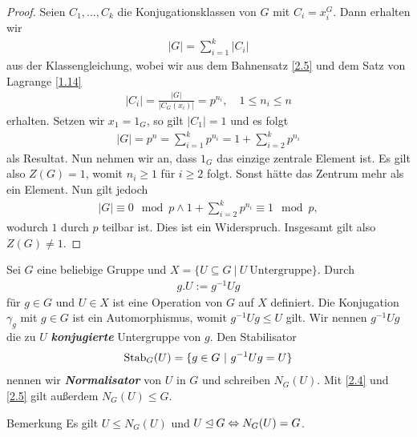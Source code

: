 \begin{proof}
Seien $C_1,...,C_k$ die Konjugationsklassen von $G$ mit $C_i = x_i^G$.
Dann erhalten wir 
\begin{align*}
|G| = \sum\limits_{i=1}^k |C_i|
\end{align*}
aus der Klassengleichung, wobei wir aus dem Bahnensatz \ref{2.5} und dem Satz von Lagrange \ref{1.14}
\begin{align*}
|C_i| = \frac{|G|}{|C_G(x_i)|} = p^{n_i}, \quad 1 \leq n_i \leq n
\end{align*}
erhalten. Setzen wir $x_1 = 1_G$, so gilt $|C_1| = 1$ und es folgt
\begin{align*}
|G| = p^n = \sum \limits_{i=1}^k p^{n_i} = 1 + \sum \limits_{i=2}^k p^{n_i}
\end{align*}
als Resultat. Nun nehmen wir an, dass $1_G$ das einzige zentrale Element ist.
Es gilt also $Z(G) = 1$, womit $n_i \geq 1$ für $i \geq 2$ folgt. Sonst hätte das Zentrum mehr als ein Element.
Nun gilt jedoch 
\begin{align*}
|G| \equiv 0 \mod p \wedge 1 + \sum \limits_{i=2}^k p^{n_i} \equiv 1 \mod p,
\end{align*}
wodurch $1$ durch $p$ teilbar ist. Dies ist ein Widerspruch.
Insgesamt gilt also $Z(G) \neq 1$.
\end{proof}

\begin{df}\label{skript:2.11}  
Sei $G$ eine beliebige Gruppe und $X = \lbrace U \subseteq G \ | \ U \ \text{Untergruppe} \rbrace$.
Durch
\begin{align*}
g.U := g^{-1} U g
\end{align*}
für $g \in G$ und $U \in X$ ist eine Operation von $G$ auf $X$ definiert.
Die Konjugation $\gamma_g$ mit $g \in G$ ist ein Automorphismus, womit $g^{-1} U g \leq U $ gilt.
Wir nennen $g^{-1} U g $ die zu $U$ \textbf{\textit{konjugierte}} Untergruppe von $g$. 
Den Stabilisator 
\begin{align*}
\operatorname{Stab}_G(U) = \lbrace g \in G \ | \ g^{-1} U g = U \rbrace
\end{align*}
nennen wir \textbf{\textit{Normalisator}} von $U$ in $G$ und schreiben $N_G(U)$.
Mit \ref{2.4} und \ref{2.5} gilt außerdem $N_G(U) \leq G$.
\end{df}

\begin{genericdf}{Bemerkung} \label{2.12}
Es gilt $U \leq N_G(U)$ und $U \unlhd G \Leftrightarrow N_G(U) = G$.
\end{genericdf}

